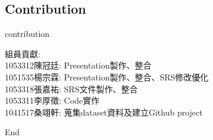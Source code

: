 \documentclass{beamer}
\begin{document}
\subsection{Contribution}
\begin{frame}{contribution}
 \begin{spacing}{1.5}
\begin{CJK}{UTF8}{bkai}
組員貢獻:\\
1053312陳冠廷: Presentation製作、整合\\
1051535楊宗霖: Presentation製作、整合、SRS修改優化\\
1053318張嘉祐: SRS文件製作、整合\\
1053311李厚徵: Code實作\\
1041517桑翊軒: 蒐集dataset資料及建立Github project
 \end{CJK}
\end{spacing}
\end{frame}

\begin{frame}
\center \huge End
\end{frame}
\end{document}
